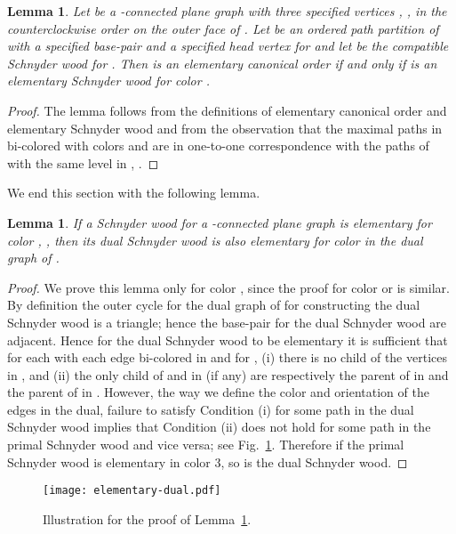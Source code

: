 \documentclass{article}
\newtheorem{lemma}[theorem]{Lemma}
\begin{document}
\begin{lemma}
\label{lem:elementary}
 Let  be a -connected plane graph with three specified vertices , ,  in the
 counterclockwise order on the outer face of . Let  be an ordered path partition of 
 with a specified base-pair  and a specified head vertex  for  and let
  be the compatible Schnyder wood for . Then
  is an elementary canonical order if and only if  is an elementary
 Schnyder wood for color .
\end{lemma}
\begin{proof} The lemma follows from the definitions of elementary canonical order and elementary
 Schnyder wood and from the observation that the maximal paths in 
 bi-colored with colors  and  are in one-to-one correspondence with the paths of  with
 the same level in , .

\end{proof}



We end this section with the following lemma.


\begin{lemma}
\label{lem:dual} If a Schnyder wood  for a -connected plane graph  is
 elementary for color , , then its dual Schnyder wood is also elementary for color 
 in the dual graph of .
\end{lemma}
\begin{proof} We prove this lemma only for color , since the proof for color  or  is similar.
By definition the outer cycle for the dual graph of  for constructing the dual Schnyder
 wood is a triangle; hence the base-pair for the dual Schnyder wood are adjacent. Hence for the dual
 Schnyder wood to be elementary it is sufficient that for each 
 with each edge  bi-colored in  and  for , (i) there is no child of the vertices
  in , and (ii) the only child of  and  in  (if any) are
 respectively the parent of  in  and the parent of  in . However, the way
 we define the color and orientation of the edges in the dual, failure to satisfy Condition (i) for some
 path in the dual Schnyder wood implies that Condition (ii) does not hold for some path in the primal
 Schnyder wood and vice versa; see Fig.~\ref{fig:elementary-dual}. Therefore if the primal Schnyder
 wood is elementary in color 3, so is the dual Schnyder wood.
\end{proof}


\begin{figure}[htbp]
\centering
\texttt{[image: elementary-dual.pdf]}
\caption{Illustration for the proof of Lemma~\ref{lem:dual}.}
\label{fig:elementary-dual}
\end{figure}
\end{document}
